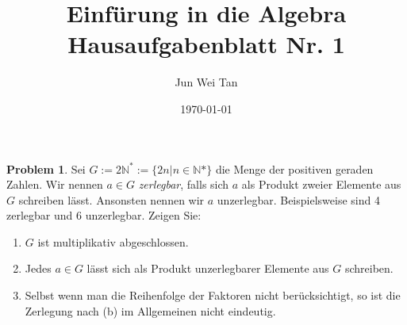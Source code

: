 \documentclass[prb,12pt]{revtex4-2}
\theoremstyle{definition}
\newtheorem{Problem}{Problem}
\theoremstyle{definition}
\newenvironment{parts}{\begin{enumerate}[label=(\alph*)]}{\end{enumerate}}
\newcommand{\N}{\mathbb{N}}
\begin{document}
\title{Einf\"{u}rung in die Algebra Hausaufgabenblatt Nr. 1}
	\author{Jun Wei Tan}
	\date{\today}
	\maketitle
\begin{Problem}
	Sei $G := 2\N^* := \{2n | n \in \N* \}$ die Menge der positiven geraden Zahlen. Wir nennen $a \in G$ \emph{zerlegbar}, falls sich $a$ als Produkt zweier Elemente aus $G$ schreiben lässt. Ansonsten nennen wir $a$ unzerlegbar. Beispielsweise sind 4 zerlegbar und 6 unzerlegbar. Zeigen Sie:
	\begin{parts}
		\item $G$ ist multiplikativ abgeschlossen.
		\item Jedes $a\in G$ l\"{a}sst sich als Produkt unzerlegbarer Elemente aus $G$ schreiben.
		\item Selbst wenn man die Reihenfolge der Faktoren nicht berücksichtigt, so ist die Zerlegung nach (b) im Allgemeinen nicht eindeutig.
	\end{parts}
\end{Problem}
\end{document}
